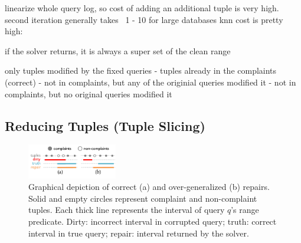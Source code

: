 

linearize whole query log, so cost of adding an additional tuple is very high.
second iteration generally takes ~1 - 10%
for large databases knn cost is pretty high: ~

if the solver returns, it is always a super set of the clean range

only tuples modified by the fixed queries
- tuples already in the complaints (correct)
- not in complaints, but any of the originial queries modified it
- not in complaints, but no original queries modified it
\fi



\subsection{Reducing Tuples (Tuple Slicing)}
\label{sec:opt:tbsize}
\begin{figure}[t]
    \centering
    \includegraphics[width=0.35\textwidth]{figures/2nditerationgroups}
    \vspace*{-.2in}
    \caption{
      Graphical depiction of correct (a) and over-generalized (b) repairs.
      Solid and empty circles represent complaint and non-complaint tuples.
      Each thick line represents the interval of query $q$'s range predicate.
      Dirty: incorrect interval in corrupted query;
      truth: correct interval in true query;
      repair: interval returned by the solver.}
    \label{fig:groups}
    \vspace*{-.2in}
\end{figure}

